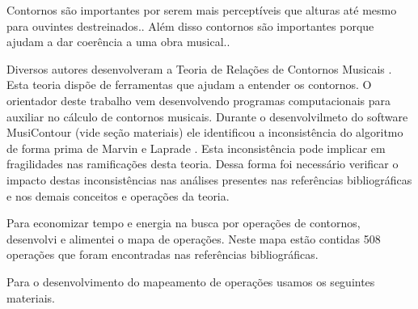 \documentclass[11pt]{article}
\begin{document}
Contornos são importantes por serem mais perceptíveis que alturas até
mesmo para ouvintes destreinados.\cite[p. 225]{Marvin1987}.
Além disso contornos são importantes porque ajudam
a dar coerência a uma obra musical.\cite[p. 225]{Clifford1995}.

Diversos autores desenvolveram a Teoria de Relações de Contornos
Musicais \cite{Friedmann1985, Friedmann1987, Morris1987, Marvin1987,
  Marvin1988, Polansky1992, Morris1993, Clifford1995, Quinn1997,
  Beard2003, Sampaio2008, Schultz2008, Schultz2009, Bor2009}. Esta
teoria dispõe de ferramentas que ajudam a entender os contornos. O
orientador deste trabalho vem desenvolvendo programas computacionais
para auxiliar no cálculo de contornos musicais. Durante o
desenvolvilmeto do software 
MusiContour (vide seção materiais) ele identificou a inconsistência 
do algoritmo de forma prima de Marvin e Laprade \cite{Marvin1987}.
Esta inconsistência pode implicar em fragilidades nas ramificações 
desta teoria.
Dessa forma foi necessário verificar o
impacto destas inconsistências nas análises presentes nas referências 
bibliográficas e nos demais conceitos e operações da teoria.

Para economizar tempo e energia na busca por operações de contornos,
desenvolvi e alimentei o mapa de operações.
Neste mapa estão contidas 508 operações que foram
encontradas nas referências bibliográficas.

\label{sec:materiais}

Para o desenvolvimento do mapeamento de operações usamos os seguintes
materiais.
\end{document}
